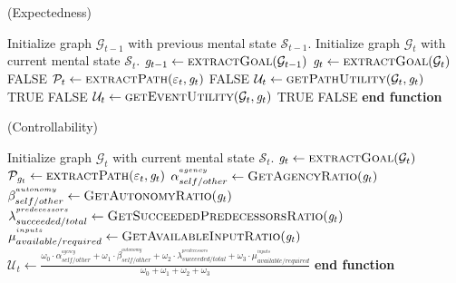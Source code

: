 \documentclass{article}
\begin{document}
\begin{algorithm}
	\caption{(Expectedness)}
	\label{array-sum}
	\begin{algorithmic}[1]
			\Statex
			\State Initialize graph $\mathcal{G}_{t-1}$ with previous mental state
			$\mathcal{S}_{t-1}$.
			\State Initialize graph $\mathcal{G}_{t}$ with current mental state
			$\mathcal{S}_{t}$.
			\Statex
			\State $\mathit{g}_{t-1} \gets \Call{extractGoal}{\mathcal{G}_{t-1}}$
			\State $\mathit{g}_{t} \gets \Call{extractGoal}{\mathcal{G}_{t}}$
			\Statex
					\State \Return FALSE
				\Else
					\State $\mathcal{P}_{t} \gets \Call{extractPath}{\varepsilon_t,
					\mathit{g}_{t}}$
						\State \Return FALSE
					\Else
						\State $\mathcal{U}_{t} \gets
						\Call{getPathUtility}{\mathcal{G}_{t}, \mathit{g}_{t}}$
							\State \Return TRUE
						\Else
							\State \Return FALSE
						\EndIf
					\EndIf
				\EndIf
			\Else
				\State $\mathcal{U}_{t} \gets
						\Call{getEventUtility}{\mathcal{G}_{t}, \mathit{g}_{t}}$
					\State \Return TRUE
				\Else
					\State \Return FALSE
				\EndIf
			\EndIf
		\EndFunction
		\State \textbf{end function}
	\end{algorithmic}
\end{algorithm}

\pagebreak

\begin{algorithm}
	\caption{(Controllability)}
	\label{array-sum}
	\begin{algorithmic}[1]
			\Statex
			\State Initialize graph $\mathcal{G}_{t}$ with current mental state
			$\mathcal{S}_{t}$.
			\Statex
			\State $\mathit{g}_{t} \gets \Call{extractGoal}{\mathcal{G}_{t}}$ 
			\State $\mathcal{P}_{\mathit{g}_{t}} \gets \Call{extractPath}{\varepsilon_t,
			\mathit{g}_{t}}$
			\Statex
			\State $\alpha_{self/other}^{^{agency}} \gets
			\Call{GetAgencyRatio}{\mathit{g}_{t}}$ 
			\Statex
			\State $\beta_{self/other}^{^{autonomy}} \gets
			\Call{GetAutonomyRatio}{\mathit{g}_{t}}$
			\Statex
			\State $\lambda_{succeeded/total}^{^{predecessors}} \gets
			\Call{GetSucceededPredecessorsRatio}{\mathit{g}_{t}}$
			\Statex
			\State $\mu_{available/required}^{^{inputs}} \gets
			\Call{GetAvailableInputRatio}{\mathit{g}_{t}}$
			\Statex
			\State $\mathcal{U}_{t} \gets
			\frac{\omega_{0}\cdot \alpha_{self/other}^{^{agency}} +
			\omega_{1}\cdot \beta_{self/other}^{^{autonomy}} + \omega_{2}\cdot
			\lambda_{succeeded/total}^{^{predecessors}} + \omega_{3}\cdot
			\mu_{available/required}^{^{inputs}}}{\omega_{0} + \omega_{1} + \omega_{2} +
			\omega_{3}}$
			\Statex
				\State {}
			\Else
				\State {}
			\EndIf
		\EndFunction
		\State \textbf{end function}
		\end{algorithmic}
	\end{algorithm}
	
\end{document}
